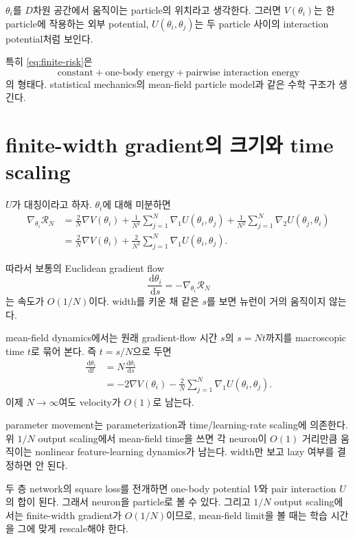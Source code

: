 \documentclass[11pt,a4paper,oneside,openany]{memoir}
\newcommand{\Risk}{\mathcal{R}}
\newcommand{\grad}{\nabla}
\newcommand{\dd}{\,\mathrm{d}}
\theoremstyle{definition}
\begin{document}
$\theta_i$를 $D$차원 공간에서 움직이는 particle의 위치라고 생각한다. 그러면
$V(\theta_i)$는 한 particle에 작용하는 외부 potential,
$U(\theta_i,\theta_j)$는 두 particle 사이의 interaction potential처럼 보인다.

특히 \eqref{eq:finite-risk}은
\[
  \text{constant}
  +\text{one-body energy}
  +\text{pairwise interaction energy}
\]
의 형태다. statistical mechanics의 mean-field particle model과 같은 수학 구조가 생긴다.

\section{finite-width gradient의 크기와 time scaling}

$U$가 대칭이라고 하자. $\theta_i$에 대해 미분하면
\begin{align*}
\grad_{\theta_i}\Risk_N
&=\frac{2}{N}\grad V(\theta_i)
 +\frac1{N^2}\sum_{j=1}^N\grad_1U(\theta_i,\theta_j)
 +\frac1{N^2}\sum_{j=1}^N\grad_2U(\theta_j,\theta_i)\\
&=\frac{2}{N}\grad V(\theta_i)
 +\frac{2}{N^2}\sum_{j=1}^N\grad_1U(\theta_i,\theta_j).
\end{align*}

따라서 보통의 Euclidean gradient flow
\[
  \frac{\dd\theta_i}{\dd s}=-\grad_{\theta_i}\Risk_N
\]
는 속도가 $O(1/N)$이다. width를 키운 채 같은 $s$를 보면 뉴런이 거의 움직이지 않는다.

mean-field dynamics에서는 원래 gradient-flow 시간 $s$의 $s=Nt$까지를 macroscopic time $t$로 묶어 본다. 즉 $t=s/N$으로 두면
\begin{align*}
\frac{\dd\theta_i}{\dd t}
&=N\frac{\dd\theta_i}{\dd s}\\
&=-2\grad V(\theta_i)
  -\frac{2}{N}\sum_{j=1}^N\grad_1U(\theta_i,\theta_j).
\end{align*}
이제 $N\to\infty$여도 velocity가 $O(1)$로 남는다.

\begin{warningbox}
parameter movement는 parameterization과 time/learning-rate scaling에 의존한다.
위 $1/N$ output scaling에서 mean-field time을 쓰면 각 neuron이 $O(1)$ 거리만큼 움직이는
nonlinear feature-learning dynamics가 남는다. width만 보고 lazy 여부를 결정하면 안 된다.
\end{warningbox}

\begin{presentbox}
두 층 network의 square loss를 전개하면 one-body potential $V$와 pair interaction $U$의 합이 된다.
그래서 neuron을 particle로 볼 수 있다. 그리고 $1/N$ output scaling에서는 finite-width gradient가
$O(1/N)$이므로, mean-field limit을 볼 때는 학습 시간을 그에 맞게 rescale해야 한다.
\end{presentbox}
\end{document}
